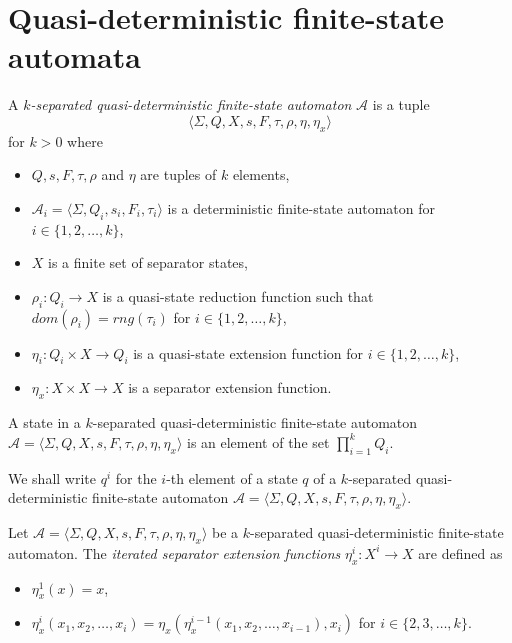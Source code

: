 \section{Quasi-deterministic finite-state automata}
\label{section:quasi_deterministic_finite_state_automata}

\begin{definition}
  A \emph{$k$-separated quasi-deterministic finite-state automaton} $\mathcal{A}$ is
  a tuple
  \begin{equation*}
    \langle \Sigma, Q, X, s, F, \tau, \rho, \eta, \eta_x \rangle
  \end{equation*}
  for $k > 0$ where
  \begin{itemize}
    \item $Q, s, F, \tau, \rho$ and $\eta$ are tuples of $k$ elements,
    \item $\mathcal{A}_i = \langle \Sigma, Q_i, s_i, F_i, \tau_i \rangle$ is a
          deterministic finite-state automaton for $i \in \{ 1, 2, \ldots, k
            \}$,
    \item $X$ is a finite set of separator states,
    \item $\rho_i : Q_i \rightarrow X$ is a quasi-state reduction function such
          that $dom(\rho_i) = rng(\tau_i)$ for $i \in \{ 1, 2, \ldots, k \}$,
    \item $\eta_i : Q_i \times X \rightarrow Q_i$ is a quasi-state extension
          function for $i \in \{ 1, 2, \ldots, k \}$,
    \item $\eta_x : X \times X \rightarrow X$ is a separator extension function.
  \end{itemize}
\end{definition}

\begin{definition}
  A state in a $k$-separated quasi-deterministic finite-state automaton $\mathcal{A}
  = \langle \Sigma, Q, X, s, F, \tau, \rho, \eta, \eta_x \rangle$ is an element of
  the set $\prod_{i=1}^k Q_i$.
\end{definition}

We shall write $q^i$ for the $i$-th element of a state $q$ of a $k$-separated
quasi-deterministic finite-state automaton $\mathcal{A} = \langle \Sigma, Q, X, s,
F, \tau, \rho, \eta, \eta_x \rangle$.

\begin{definition}
  Let $\mathcal{A} = \langle \Sigma, Q, X, s, F, \tau, \rho, \eta, \eta_x \rangle$ be
  a $k$-separated quasi-deterministic finite-state automaton. The \emph{iterated
  separator extension functions} $\eta_x^i : X^i \rightarrow X$ are defined as
  \begin{itemize}
    \item $\eta_x^1(x) = x$,
    \item $\eta_x^i(x_1, x_2, \ldots, x_i) = \eta_x(\eta_x^{i-1}(x_1, x_2, \ldots,
	    x_{i-1}), x_i)$ for $i \in \{ 2, 3, \ldots, k \}$.
  \end{itemize}
\end{definition}

